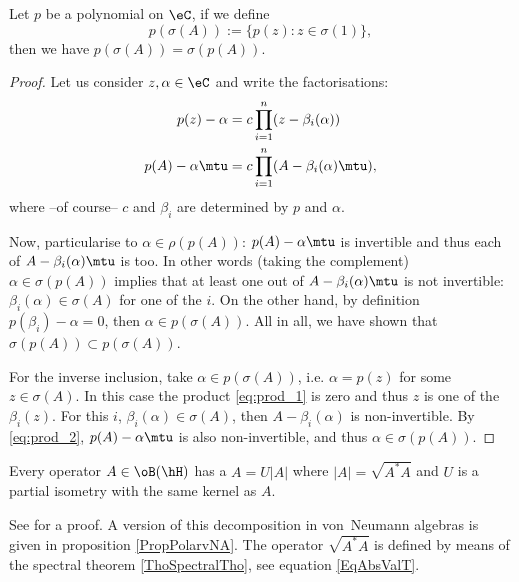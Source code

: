 \begin{lemma}
Let $p$ be a polynomial on $\eC$, if we define
\[
   p(\sigma(A)):=\{ p(z):z\in\sigma(1) \},
\]
then we have $p(\sigma(A))=\sigma(p(A))$. \label{lem:sigma_poly}
\end{lemma}

\begin{proof}
	Let us consider $z,\alpha\in\eC$ and write the factorisations:
	\begin{subequations}
	\begin{align}
	  p(z)-\alpha&=c\prod_{i=1}^{n}(z-\beta_i(\alpha))\label{eq:prod_1}\\
	  p(A)-\alpha\mtu&=c\prod_{i=1}^{n}(A-\beta_i(\alpha)\mtu)\label{eq:prod_2},
	\end{align}
	\end{subequations}
	where --of course-- $c$ and $\beta_i$ are determined by $p$ and $\alpha$.

	Now, particularise to $\alpha\in\rho(p(A))$: $p(A)-\alpha\mtu$ is invertible and thus each of $A-\beta_i(\alpha)\mtu$ is too. In other words (taking the complement) $\alpha\in\sigma(p(A))$ implies that at least one out of $A-\beta_i(\alpha)\mtu$ is not invertible: $\beta_i(\alpha)\in\sigma(A)$ for one of the $i$. On the other hand, by definition $p(\beta_i)-\alpha=0$, then $\alpha\in p(\sigma(A))$. All in all, we have shown that $\sigma(p(A))\subset p(\sigma(A))$.

	For the inverse inclusion, take $\alpha\in p(\sigma(A))$, i.e. $\alpha=p(z)$ for some $z\in\sigma(A)$. In this case the product \eqref{eq:prod_1} is zero and thus $z$ is one of the $\beta_i(z)$. For this $i$, $\beta_i(\alpha)\in\sigma(A)$, then $A-\beta_i(\alpha)$ is non-invertible. By \eqref{eq:prod_2}, $p(A)-\alpha\mtu$ is also non-invertible, and thus $\alpha\in\sigma(p(A))$.

\end{proof}

\begin{lemma}		\label{LemPolarHilbert}
	Every operator $A\in \oB(\hH)$ has a  $A=U| A |$ where $| A |=\sqrt{A^*A}$ and $U$ is a partial isometry with the same kernel as $A$.
\end{lemma}

See \cite{Landsman} for a proof. A version of this decomposition in von~Neumann algebras is given in proposition \ref{PropPolarvNA}. The operator $\sqrt{A^*A}$ is defined by means of the spectral theorem \ref{ThoSpectralTho}, see equation \eqref{EqAbsValT}.

